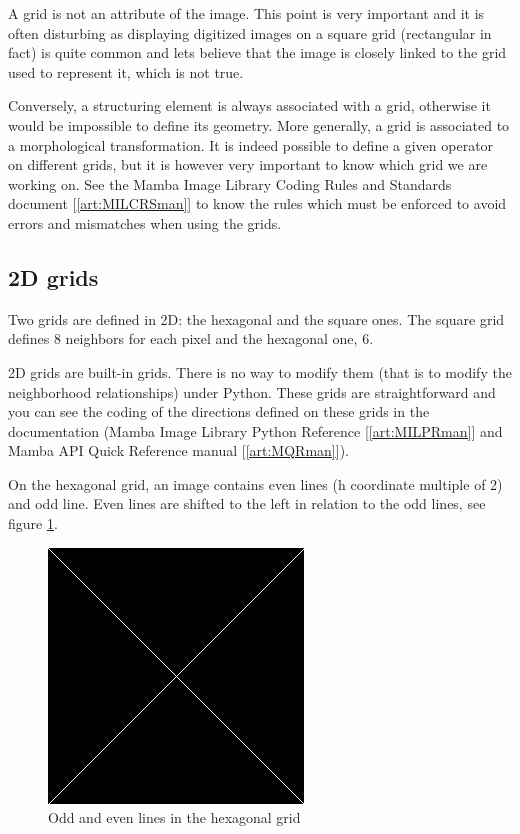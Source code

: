 \documentclass[a4paper,10pt,oneside]{article}
\begin{document}
A grid is not an attribute of the image. This point is very important and it is often disturbing as
displaying digitized images on a square grid (rectangular in fact) is quite common and lets believe that
the image is closely linked to the grid used to represent it, which is not true.

Conversely, a structuring element is always associated with a grid, otherwise it would be impossible
to define its geometry. More generally, a grid is associated to a morphological transformation. It is
indeed possible to define a given operator on different grids, but it is however very important to
know which grid we are working on. See the Mamba Image Library Coding Rules and Standards document [\ref{art:MILCRSman}] to
know the rules which must be enforced to avoid errors and mismatches when using the grids.

\subsection{2D grids}
\label{cha:2Dgrids}
Two grids are defined in 2D: the hexagonal and the square ones. 
The square grid defines 8 neighbors for each pixel and the hexagonal one, 6.

2D grids are built-in grids. There is no way to modify them (that is to modify the neighborhood
relationships) under Python. These grids are straightforward and you can see the coding of the directions
defined on these grids in the documentation (Mamba Image Library Python Reference [\ref{art:MILPRman}] and Mamba API
Quick Reference manual [\ref{art:MQRman}]).

On the hexagonal grid, an image contains even lines (h coordinate multiple of 2) and odd line. Even lines
are shifted to the left in relation to the odd lines, see figure \ref{fig:hex_grid}.
 
\begin{figure}
\centering
\includegraphics[scale=0.3]{figures/xxx.png}
\caption{Odd and even lines in the hexagonal grid}
\label{fig:hex_grid}
\end{figure}
\end{document}
